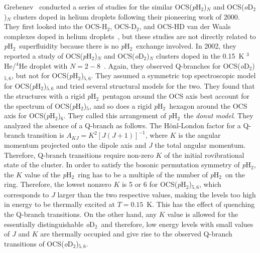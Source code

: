 \documentclass[12pt]{iopart}
\newcommand{\odtwo}{{\em o}D$_2$}
\newcommand{\phtwo}{{\em p}H$_2$}
\begin{document}
Grebenev \etal~conducted a series of studies for the similar OCS(\phtwo)$_N$ and OCS(\odtwo)$_N$ clusters doped in helium droplets following their pioneering work of 2000. 
They first looked into the OCS-H$_2$, OCS-D$_2$, and OCS-HD van der Waals complexes doped in helium droplets~\cite{grebenev_ocs-h2,grebenev_ocs-hd}, but these studies are not directly related to \phtwo~superfluidity because there is no \phtwo~exchange involved. 
In 2002, they reported a study of OCS(\phtwo)$_N$ and OCS(\odtwo)$_N$ clusters doped in the 0.15~K $^3$He/$^4$He droplet with $N=2-8$~\cite{grebenev_pH2_5ring,vilesov_ocs_ph2_he}. 
Again, they observed Q-branches for OCS(\odtwo)$_{5,6}$, but not for OCS(\phtwo)$_{5,6}$. 
They assumed a symmetric top spectroscopic model for OCS(\phtwo)$_{5,6}$ and tried several structural models for the two. 
They found that the structures with a rigid \phtwo~pentagon around the OCS axis best account for the spectrum of OCS(\phtwo)$_{5}$, and so does a rigid \phtwo~hexagon around the OCS axis for OCS(\phtwo)$_{6}$. 
They called this arrangement of \phtwo~the {\em donut model}. 
They analyzed the absence of a Q-branch as follows. 
The H\"onl-London factor for a Q-branch transition is $A_{KJ}=K^2[J(J+1)]^{-1}$, where $K$ is the angular momentum projected onto the dipole axis and $J$ the total angular momentum. Therefore, Q-branch transitions require non-zero $K$ of the initial rovibrational state of the cluster. 
In order to satisfy the bosonic permutation symmetry of \phtwo, the $K$ value of the \phtwo~ring has to be a multiple of the number of \phtwo~on the ring.  Therefore, the lowest nonzero $K$ is 5 or 6 for OCS(\phtwo)$_{5,6}$, which corresponds to $J$ larger than the two respective values, making the levels too high in energy to be thermally excited at $T=0.15$~K. This has the effect of  quenching the Q-branch transitions. 
On the other hand, any $K$ value is allowed for the essentially distinguishable \odtwo~and therefore, 
low energy levels with small values of $J$ and $K$ are thermally occupied and give rise to the observed Q-branch transitions of OCS(\odtwo)$_{5,6}$.
\end{document}
